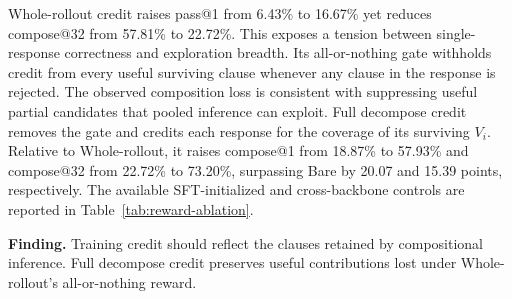 Whole-rollout credit raises pass@1 from 6.43\% to 16.67\% yet reduces
compose@32 from 57.81\% to 22.72\%.  This exposes a tension between
single-response correctness and exploration breadth.  Its all-or-nothing
gate withholds credit from every useful surviving clause whenever any clause
in the response is rejected.  The observed composition loss is consistent
with suppressing useful partial candidates that pooled inference can exploit.
Full decompose credit removes the gate and credits
each response for the coverage of its surviving \(V_i\).  Relative to
Whole-rollout, it raises compose@1 from 18.87\% to 57.93\% and compose@32 from
22.72\% to 73.20\%, surpassing Bare by 20.07 and 15.39 points, respectively.
The available SFT-initialized and cross-backbone controls are reported in
Table~\ref{tab:reward-ablation}.

\begin{insightbox}
\textbf{Finding.}
Training credit should reflect the clauses retained by compositional
inference.  Full decompose credit preserves useful contributions lost
under Whole-rollout's all-or-nothing reward.
\end{insightbox}
